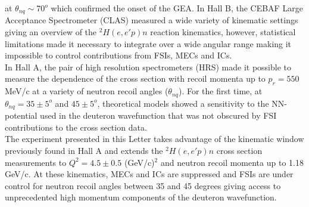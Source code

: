 at $\theta_{nq} \sim 70^{o}$ which confirmed the onset of the GEA\cite{Sargsian_2001,PhysRevC.56.1124}. In Hall B, the CEBAF Large Acceptance Spectrometer (CLAS) measured a wide variety
of kinematic settings giving an overview of the $^{2}H(e,e'p)n$ reaction kinematics, however, statistical limitations made it necessary to integrate over a wide angular range making
it impossible to control contributions from FSIs, MECs and ICs. \\
\indent In Hall A, the pair of high resolution spectrometers (HRS) made it possible to measure the dependence of the cross section
with recoil momenta up to $p_{r}=550$ MeV/c at a variety of neutron recoil angles ($\theta_{nq}$). For the first time, at $\theta_{nq}=35\pm5^{o}$
and $45\pm5^{o}$, theoretical models showed a sensitivity to the NN-potential used in the deuteron wavefunction that was not obscured by FSI contributions to the cross section data.\\
\indent The experiment presented in this Letter takes advantage of the kinematic window previously found in Hall A\cite{PhysRevLett.107.262501} and extends the $^{2}H(e,e'p)n$ cross section measurements
to $Q^{2}=4.5\pm0.5$ (GeV/c)$^{2}$ and neutron recoil momenta up to 1.18 GeV/c. At these kinematics, MECs and ICs are suppressed and FSIs are under control for neutron recoil angles between 35 and 45 degrees
giving access to unprecedented high momentum components of the deuteron wavefunction. \\
